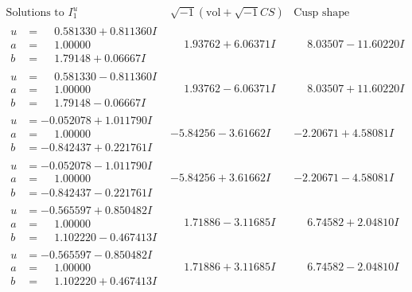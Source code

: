 \documentclass[1p]{elsarticle_modified}
\theoremstyle{definition}
\newcommand{\I}{\sqrt{-1}}
\begin{document}
$$\begin{array}{c|c|c}  
\text{Solutions to }I^u_{1}& \I (\text{vol} + \sqrt{-1}CS) & \text{Cusp shape}\\
 \hline 
\begin{aligned}
u &= \phantom{-}0.581330 + 0.811360 I \\
a &= \phantom{-}1.00000\phantom{ +0.000000I} \\
b &= \phantom{-}1.79148 + 0.06667 I\end{aligned}
 & \phantom{-}1.93762 + 6.06371 I & \phantom{-}8.03507 - 11.60220 I \\ \hline\begin{aligned}
u &= \phantom{-}0.581330 - 0.811360 I \\
a &= \phantom{-}1.00000\phantom{ +0.000000I} \\
b &= \phantom{-}1.79148 - 0.06667 I\end{aligned}
 & \phantom{-}1.93762 - 6.06371 I & \phantom{-}8.03507 + 11.60220 I \\ \hline\begin{aligned}
u &= -0.052078 + 1.011790 I \\
a &= \phantom{-}1.00000\phantom{ +0.000000I} \\
b &= -0.842437 + 0.221761 I\end{aligned}
 & -5.84256 - 3.61662 I & -2.20671 + 4.58081 I \\ \hline\begin{aligned}
u &= -0.052078 - 1.011790 I \\
a &= \phantom{-}1.00000\phantom{ +0.000000I} \\
b &= -0.842437 - 0.221761 I\end{aligned}
 & -5.84256 + 3.61662 I & -2.20671 - 4.58081 I \\ \hline\begin{aligned}
u &= -0.565597 + 0.850482 I \\
a &= \phantom{-}1.00000\phantom{ +0.000000I} \\
b &= \phantom{-}1.102220 - 0.467413 I\end{aligned}
 & \phantom{-}1.71886 - 3.11685 I & \phantom{-}6.74582 + 2.04810 I \\ \hline\begin{aligned}
u &= -0.565597 - 0.850482 I \\
a &= \phantom{-}1.00000\phantom{ +0.000000I} \\
b &= \phantom{-}1.102220 + 0.467413 I\end{aligned}
 & \phantom{-}1.71886 + 3.11685 I & \phantom{-}6.74582 - 2.04810 I \\ \hline\begin{aligned}

\end{aligned}
\end{array}$$
\end{document}
